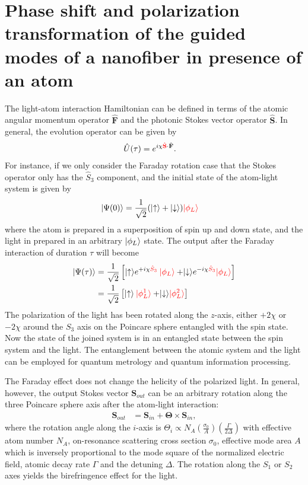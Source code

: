 \documentclass[preprint,aps,pra,onecolumn]{revtex4-1} %
\begin{document}
\section{Phase shift and polarization transformation of the guided modes of a nanofiber in presence of an atom}
The light-atom interaction Hamiltonian can be defined in terms of the atomic angular momentum operator $\hat{\mathbf{F}}$ and the photonic Stokes vector operator $ \hat{\mathbf{S}}$. In general, the evolution operator can be given by
\begin{align}
\hat{U}(\tau)&=e^{i\chi \mathbin{\color{red}{\hat{\mathbf{S}}}} \cdot \hat{\mathbf{F}}}.
\end{align}
For instance, if we only consider the Faraday rotation case that the Stokes operator only has the $\hat{S}_3$ component, and the initial state of the atom-light system is given by
\begin{align}
\lvert{\Psi(0)}\rangle &=\frac{1}{\sqrt{2}}(\lvert{\uparrow}\rangle+\lvert{\downarrow}\rangle)\mathbin{\color{red}{\lvert{\phi_L}\rangle}}
\end{align}
where the atom is prepared in a superposition of spin up and down state, and the light in prepared in an arbitrary $\lvert{\phi_L}\rangle$ state. The output after the Faraday interaction of duration $\tau$ will become
\begin{align}
\lvert{\Psi(\tau)}\rangle&=\frac{1}{\sqrt{2}}\left[\lvert{\uparrow}\rangle e^{+i\chi \mathbin{\color{red}{\hat{S}_3}}}\mathbin{\color{red}{\lvert{\phi_L}\rangle}} 
+\lvert{\downarrow}\rangle e^{-i\chi \mathbin{\color{red}{\hat{S}_3}}}\mathbin{\color{red}{\lvert{\phi_L}\rangle}} \right]\\
&=\frac{1}{\sqrt{2}}\left[\lvert{\uparrow}\rangle\mathbin{\color{red}{\lvert{\phi^1_L}\rangle}} 
+\lvert{\downarrow}\rangle\mathbin{\color{red}{\lvert{\phi^2_L}\rangle}} \right]
\end{align}
The polarization of the light has been rotated along the $z$-axis, either $+2\chi$ or $ -2\chi$ around the $S_3$ axis on the Poincare sphere entangled with the spin state. Now the state of the joined system is in an entangled state between the spin system and the light. The entanglement between the atomic system and the light can be employed for quantum metrology and quantum information processing. 

The Faraday effect does not change the helicity of the polarized light. In general, however, the output Stokes vector $\mathbf{S}_{out}$ can be an arbitrary rotation along the three Poincare sphere axis after the atom-light interaction:
\begin{align}
\mathbf{S}_{out} &= \mathbf{S}_{in}+\mathbf{\Theta}\times\mathbf{S}_{in},
\end{align}
where the rotation angle along the $i$-axis is $\Theta_i \propto N_A\left( \frac{\sigma_0}{A}\right) \left(\frac{\Gamma}{2\Delta}\right)$ with effective atom number $N_A$, on-resonance scattering cross section $\sigma_0$, effective mode area $A$ which is inversely proportional to the mode square of the normalized electric field, atomic decay rate $\Gamma$ and the detuning $\Delta$. The rotation along the $S_1$ or $S_2$ axes yields the birefringence effect for the light. 
\end{document}
